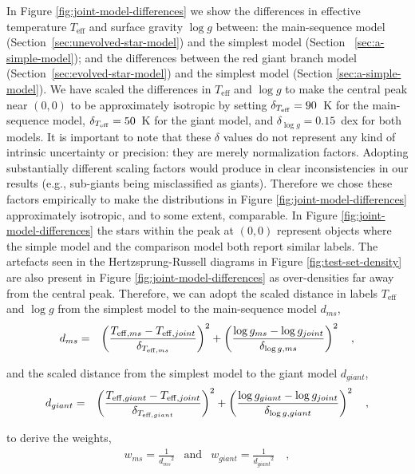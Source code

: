 \documentclass[preprint,trackchanges]{aastex}
\newcommand{\teff}{T_{\mathrm{eff}}}
\newcommand{\logg}{\log g}
\begin{document}
In Figure \ref{fig:joint-model-differences} we show the differences in effective 
temperature $\teff$ and surface gravity $\logg$ between: the main-sequence model 
(Section~\ref{sec:unevolved-star-model}) and the simplest model (Section~
\ref{sec:a-simple-model}); and the differences between the red giant branch model 
(Section~\ref{sec:evolved-star-model}) and the simplest model (Section 
\ref{sec:a-simple-model}).  We have scaled the differences in $\teff$ and $\logg$ 
to make the central peak near $(0, 0)$ to be approximately isotropic by setting
	$\delta_{T_{\rm eff}} = 90$~K for the main-sequence model, 
	$\delta_{T_{\rm eff}} = 50$~K for the giant model, and 
	$\delta_{\log{g}} = 0.15$~dex for both models.
It is important to note that these $\delta$ values do not represent any kind of 
intrinsic uncertainty or precision: they are merely normalization factors.  Adopting
substantially different scaling factors would produce in clear inconsistencies in our
results (e.g., sub-giants being misclassified as giants).  Therefore we chose these 
factors empirically to make the distributions in Figure \ref{fig:joint-model-differences}
approximately isotropic, and to some extent, comparable.  In Figure 
\ref{fig:joint-model-differences} the stars within the peak at $(0, 0)$ represent 
objects where the simple model and the comparison model both report similar labels.  
The artefacts seen in the Hertzsprung-Russell diagrams in Figure \ref{fig:test-set-density} 
are also present in Figure \ref{fig:joint-model-differences} as over-densities far away
from the central peak.  Therefore, we can adopt the scaled distance in labels 
$\teff$ and $\logg$ from the simplest model to the main-sequence model $d_{ms}$,
\begin{eqnarray}
	d_{ms} & = & \left(\frac{T_{{\rm eff},ms} - T_{{\rm eff},joint}}{\delta_{T_{{\rm eff},ms}}}\right)^2 + \left(\frac{\log{g}_{ms} - \log{g}_{joint}}{\delta_{\log{g},ms}}\right)^2 \quad ,
\end{eqnarray}

\noindent{}and the scaled distance from the simplest model to the giant model $d_{giant}$,
\begin{eqnarray}
	d_{giant} & = & \left(\frac{T_{{\rm eff},giant} - T_{{\rm eff},joint}}{\delta_{T_{{\rm eff},giant}}}\right)^2 + \left(\frac{\log{g}_{giant} - \log{g}_{joint}}{\delta_{\log{g},giant}}\right)^2  \quad ,
\label{eq:d_giant}
\end{eqnarray}

\noindent{}to derive the weights,
\begin{eqnarray}
	w_{ms} = \frac{1}{{d_{ms}}^2} & \text{and} & w_{giant} = \frac{1}{{d_{giant}}^2} \quad ,
\end{eqnarray}
\end{document}
